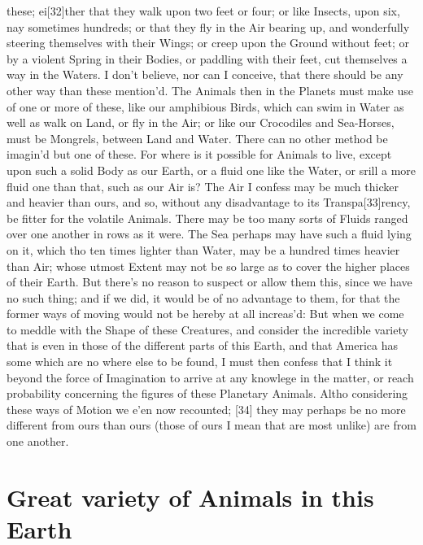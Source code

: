 \documentclass[letterpaper]{book}
\begin{document}
these; ei[32]ther that they walk upon two feet or four; or like Insects,
upon six, nay sometimes hundreds; or that they fly in the Air bearing up,
and wonderfully steering themselves with their Wings; or creep upon the
Ground without feet; or by a violent Spring in their Bodies, or paddling
with their feet, cut themselves a way in the Waters.  I don't believe, nor
can I conceive, that there should be any other way than these mention'd. The
Animals then in the Planets must make use of one or more of these, like our
amphibious Birds, which can swim in Water as well as walk on Land, or fly in
the Air; or like our Crocodiles and Sea-Horses, must be Mongrels, between
Land and Water. There can no other method be imagin'd but one of these. For
where is it possible for Animals to live, except upon such a solid Body as
our Earth, or a fluid one like the Water, or srill a more fluid one than
that, such as our Air is? The Air I confess may be much thicker and heavier
than ours, and so, without any disadvantage to its Transpa[33]rency, be
fitter for the volatile Animals. There may be too many sorts of Fluids
ranged over one another in rows as it were. The Sea perhaps may have such a
fluid lying on it, which tho ten times lighter than Water, may be a hundred
times heavier than Air; whose utmost Extent may not be so large as to cover
the higher places of their Earth. But there's no reason to suspect or allow
them this, since we have no such thing; and if we did, it would be of no
advantage to them, for that the former ways of moving would not be hereby at
all increas'd: But when we come to meddle with the Shape of these Creatures,
and consider the incredible variety that is even in those of the different
parts of this Earth, and that America has some which are no where else to be
found, I must then confess that I think it beyond the force of Imagination
to arrive at any knowlege in the matter, or reach probability concerning the
figures of these Planetary Animals. Altho considering these ways of Motion
we e'en now recounted; [34] they may perhaps be no more different from ours
than ours (those of ours I mean that are most unlike) are from one another.


\section{Great variety of Animals in this Earth}
\end{document}
